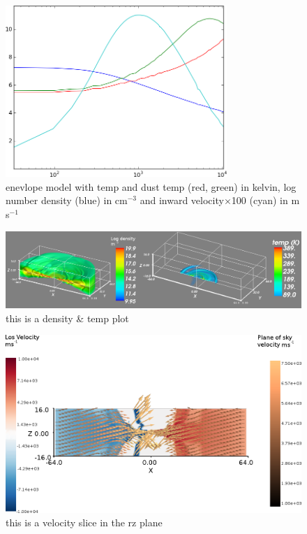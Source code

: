 \documentclass[useAMS,usenatbib]{mn2e}
\begin{document}
\begin{figure}
 \includegraphics[width=84mm]{Figures/model/L1544model_used.png}

 \caption{enevlope model with temp and dust temp (red, green) in kelvin, log number density (blue) in cm$^{-3}$ and inward velocity$\times$100 (cyan) in m$\,$s$^{-1}$}
\end{figure}

\begin{figure}
 \includegraphics[width=168mm]{Figures/model/rhoT.png}

 \caption{this is a density \& temp plot}
\end{figure}

\begin{figure}
 \includegraphics[width=168mm]{Figures/model/velocity_rzSlice_thetaColourScale2.png}

 \caption{this is a velocity slice in the rz plane}
\end{figure}
\end{document}
